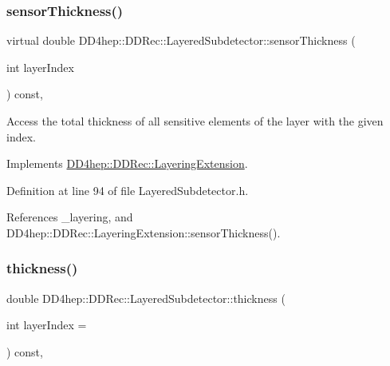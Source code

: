 \hypertarget{class_d_d4hep_1_1_d_d_rec_1_1_layered_subdetector_a2bcb59309c2b579285e55daf4ccfbe3c}{}\label{class_d_d4hep_1_1_d_d_rec_1_1_layered_subdetector_a2bcb59309c2b579285e55daf4ccfbe3c} 
\subsubsection{\texorpdfstring{sensor\+Thickness()}{sensorThickness()}}
{\footnotesize\ttfamily virtual double D\+D4hep\+::\+D\+D\+Rec\+::\+Layered\+Subdetector\+::sensor\+Thickness (\begin{DoxyParamCaption}\item[{int}]{layer\+Index }\end{DoxyParamCaption}) const\hspace{0.3cm}{\ttfamily [inline]}, {\ttfamily [virtual]}}



Access the total thickness of all sensitive elements of the layer with the given index. 



Implements \hyperlink{class_d_d4hep_1_1_d_d_rec_1_1_layering_extension_a06a960f9de84690eb3383f89d1aada13}{D\+D4hep\+::\+D\+D\+Rec\+::\+Layering\+Extension}.



Definition at line 94 of file Layered\+Subdetector.\+h.



References \+\_\+layering, and D\+D4hep\+::\+D\+D\+Rec\+::\+Layering\+Extension\+::sensor\+Thickness().

\hypertarget{class_d_d4hep_1_1_d_d_rec_1_1_layered_subdetector_ad9137940a82be255808d475379d292b6}{}\label{class_d_d4hep_1_1_d_d_rec_1_1_layered_subdetector_ad9137940a82be255808d475379d292b6} 
\subsubsection{\texorpdfstring{thickness()}{thickness()}}
{\footnotesize\ttfamily double D\+D4hep\+::\+D\+D\+Rec\+::\+Layered\+Subdetector\+::thickness (\begin{DoxyParamCaption}\item[{int}]{layer\+Index = {} }\end{DoxyParamCaption}) const\hspace{0.3cm}{\ttfamily [inline]}, {\ttfamily [virtual]}}



